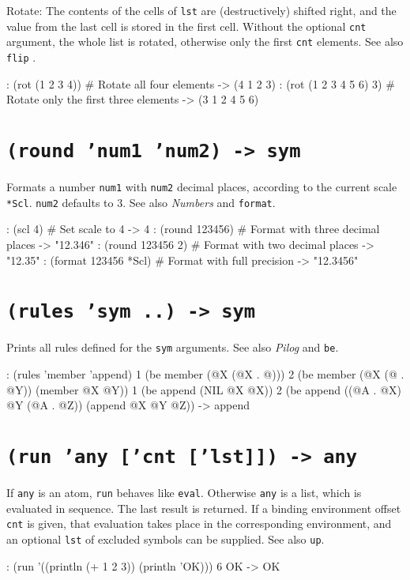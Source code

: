 Rotate: The contents of the cells of \texttt{lst} are (destructively) shifted
right, and the value from the last cell is stored in the first cell.
Without the optional \texttt{cnt} argument, the whole list is rotated,
otherwise only the first \texttt{cnt} elements. See also \texttt{flip} .


\begin{wideverbatim}
: (rot (1 2 3 4))             # Rotate all four elements
-> (4 1 2 3)
: (rot (1 2 3 4 5 6) 3)       # Rotate only the first three elements
-> (3 1 2 4 5 6)
\end{wideverbatim}

 
\section*{\texttt{(round 'num1 'num2) -> sym}}
\label{sec:func-ref-R-(round 'num1 'num2) -> sym}


Formats a number \texttt{num1} with \texttt{num2} decimal places, according to the
current scale \texttt{*Scl}. \texttt{num2} defaults to 3. See also
\emph{Numbers} and \texttt{format}.


\begin{wideverbatim}
: (scl 4)               # Set scale to 4
-> 4
: (round 123456)        # Format with three decimal places
-> "12.346"
: (round 123456 2)      # Format with two decimal places
-> "12.35"
: (format 123456 *Scl)  # Format with full precision
-> "12.3456"
\end{wideverbatim}

 
\section*{\texttt{(rules 'sym ..) -> sym}}
\label{sec:func-ref-R-(rules 'sym ..) -> sym}


Prints all rules defined for the \texttt{sym} arguments. See also
\emph{Pilog} and \texttt{be}.


\begin{wideverbatim}
: (rules 'member 'append)
1 (be member (@X (@X . @)))
2 (be member (@X (@ . @Y)) (member @X @Y))
1 (be append (NIL @X @X))
2 (be append ((@A . @X) @Y (@A . @Z)) (append @X @Y @Z))
-> append
\end{wideverbatim}

 
\section*{\texttt{(run 'any ['cnt ['lst]]) -> any}}
\label{sec:func-ref-R-(run 'any ['cnt ['lst]]) -> any}


If \texttt{any} is an atom, \texttt{run} behaves like \texttt{eval}. Otherwise \texttt{any} is a
list, which is evaluated in sequence. The last result is returned. If a
binding environment offset \texttt{cnt} is given, that evaluation takes place
in the corresponding environment, and an optional \texttt{lst} of excluded
symbols can be supplied. See also \texttt{up}.


\begin{wideverbatim}
: (run '((println (+ 1 2 3)) (println 'OK)))
6
OK
-> OK
\end{wideverbatim}


